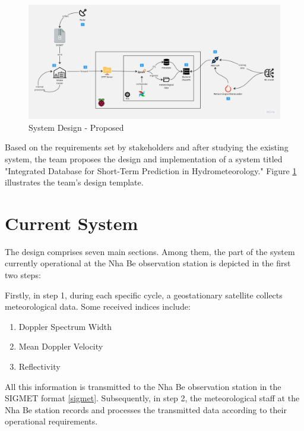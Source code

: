 \begin{figure}[H]
    \centering
    \includegraphics[width=\linewidth]{Images/4.1-architecture.jpg}
    \vspace{1em}
    \caption{System Design - Proposed}
    \label{fig:sow}
\end{figure}
\vspace{0.5cm}
Based on the requirements set by stakeholders and after studying the existing system, the team proposes the design and implementation of a system titled "Integrated Database for Short-Term Prediction in Hydrometeorology." Figure \ref{fig:sow} illustrates the team's design template.
\newpage
\section{Current System}
The design comprises seven main sections. Among them, the part of the system currently operational at the Nha Be observation station is depicted in the first two steps:

Firstly, in step 1, during each specific cycle, a geostationary satellite collects meteorological data. Some received indices include:
\begin{enumerate}
    \item Doppler Spectrum Width
    \item Mean Doppler Velocity
    \item Reflectivity
\end{enumerate}

All this information is transmitted to the Nha Be observation station in the SIGMET format \ref{sigmet}. Subsequently, in step 2, the meteorological staff at the Nha Be station records and processes the transmitted data according to their operational requirements.
